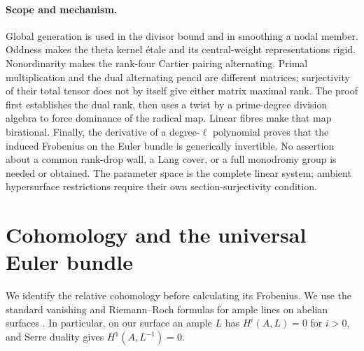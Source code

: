 \documentclass[11pt]{article}
\theoremstyle{definition}\newtheorem{definition}[theorem]{Definition}
\theoremstyle{remark}\newtheorem{remark}[theorem]{Remark}
\begin{document}
\paragraph{Scope and mechanism.}
Global generation is used in the divisor bound and in smoothing a nodal member. Oddness makes the theta kernel \'etale and its central-weight representations rigid. Nonordinarity makes the rank-four Cartier pairing alternating. Primal multiplication and the dual alternating pencil are different matrices; surjectivity of their total tensor does not by itself give either matrix maximal rank. The proof first establishes the dual rank, then uses a twist by a prime-degree division algebra to force dominance of the radical map. Linear fibres make that map birational. Finally, the derivative of a degree-$\ell$ polynomial proves that the induced Frobenius on the Euler bundle is generically invertible. No assertion about a common rank-drop wall, a Lang cover, or a full monodromy group is needed or obtained. The parameter space is the complete linear system; ambient hypersurface restrictions require their own section-surjectivity condition.

\section{Cohomology and the universal Euler bundle}\label{sec:euler}

We identify the relative cohomology before calculating its Frobenius. We use the standard vanishing and Riemann--Roch formulas for ample lines on abelian surfaces \citep[Theorems~9.11 and 9.14, pp.~131--133]{EGM}. In particular, on our surface an ample $L$ has $H^i(A,L)=0$ for $i>0$, and Serre duality gives $H^1(A,L^{-1})=0$.
\end{document}
